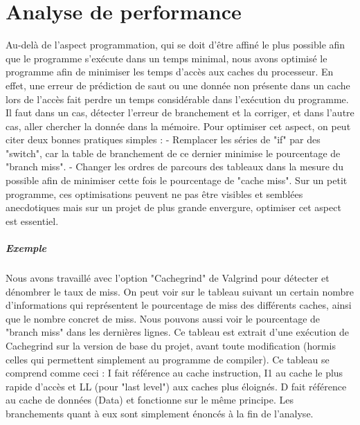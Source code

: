 \documentclass{report}
\begin{document}
\chapter{Analyse de performance}
Au-delà de l'aspect programmation, qui se doit d'être affiné le plus possible afin que le programme s’exécute dans un temps minimal, nous avons optimisé le programme afin de minimiser les temps d'accès aux caches du processeur.
En effet, une erreur de prédiction de saut ou une donnée non présente dans un cache lors de l’accès fait perdre un temps considérable dans l'exécution du programme. Il faut dans un cas, détecter l'erreur de branchement et la corriger, et dans l'autre cas, aller chercher la donnée dans la mémoire.
Pour optimiser cet aspect, on peut citer deux bonnes pratiques simples : 
\newline
- Remplacer les séries de "if" par des "switch", car la table de branchement de ce dernier minimise le pourcentage de "branch miss". 
\newline
- Changer les ordres de parcours des tableaux dans la mesure du possible afin de minimiser cette fois le pourcentage de "cache miss".
\newline
Sur un petit programme, ces optimisations peuvent ne pas être visibles et semblées anecdotiques mais sur un projet de plus grande envergure, optimiser cet aspect est essentiel.

\paragraph{Exemple}
Nous avons travaillé avec l'option "Cachegrind" de Valgrind pour détecter et dénombrer le taux de miss.
On peut voir sur le tableau suivant un certain nombre d'informations qui représentent le pourcentage de miss des différents caches, ainsi que le nombre concret de miss. 
Nous pouvons aussi voir le pourcentage de "branch miss" dans les dernières lignes. 
Ce tableau est extrait d'une exécution de Cachegrind sur la version de base du projet, avant toute modification (hormis celles qui permettent simplement au programme de compiler).
Ce tableau se comprend comme ceci :
\newline
I fait référence au cache instruction, I1 au cache le plus rapide d'accès et LL (pour "last level") aux caches plus éloignés.
\newline
D fait référence au cache de données (Data) et fonctionne sur le même principe.
Les branchements quant à eux sont simplement énoncés à la fin de l'analyse.
\end{document}

